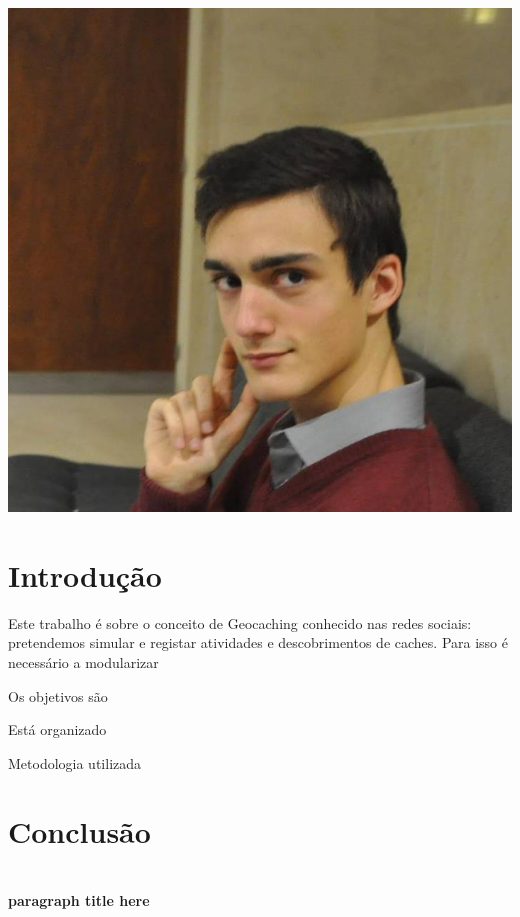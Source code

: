 \documentclass[a4paper,12pt]{article}
\begin{document}
\begin{center}
\includegraphics[height=3\baselineskip,natwidth=369,natheight=430]{martinho.jpg}
\end{center}

\pagebreak


\tableofcontents

\pagebreak

\section{Introdução}
Este trabalho é sobre o conceito de Geocaching conhecido nas redes sociais: pretendemos simular e registar atividades e descobrimentos de caches. Para isso é necessário a modularizar  

Os objetivos são

Está organizado 

Metodologia utilizada

\section{Conclusão}


\section{}
\subsection{}
\subsubsection{}

\paragraph{paragraph title here}
\end{document}
